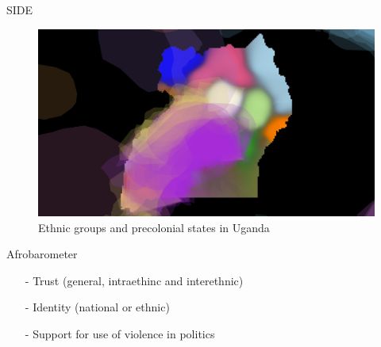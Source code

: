 \documentclass{beamer}
\begin{document}
\begin{frame}{SIDE}

\begin{figure}[htpb]
	\centering
	\includegraphics[width=0.8\linewidth]{img/UGA illustration2.pdf}
	\caption{Ethnic groups and precolonial states in Uganda}%
	\label{SIDE2}
\end{figure}	

\end{frame}

\begin{frame}{Afrobarometer}

	\begin{itemize}
		\item[-] Trust (general, intraethinc and interethnic) \pause
		\item[-] Identity (national or ethnic) \pause
		\item[-] Support for use of violence in politics
	\end{itemize}

\end{frame}
\end{document}
